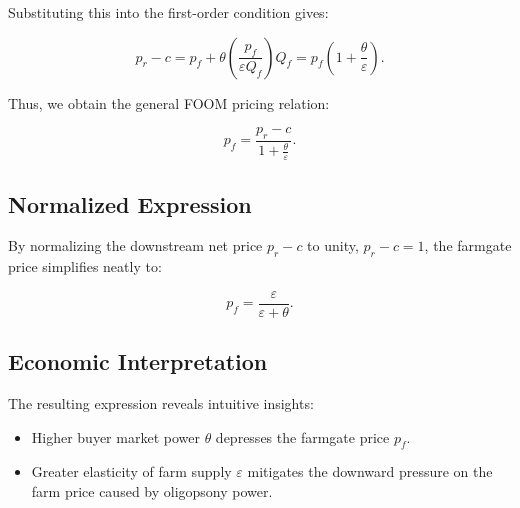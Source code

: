 Substituting this into the first-order condition gives:

\begin{equation}
p_r - c = p_f + \theta \left(\frac{p_f}{\varepsilon Q_f}\right)Q_f = p_f\left(1 + \frac{\theta}{\varepsilon}\right).
\end{equation}

Thus, we obtain the general FOOM pricing relation:

\begin{equation}
p_f = \frac{p_r - c}{1 + \frac{\theta}{\varepsilon}}.
\end{equation}

\subsection{Normalized Expression}

By normalizing the downstream net price \( p_r - c \) to unity, \( p_r - c = 1 \), the farmgate price simplifies neatly to:

\begin{equation}
p_f = \frac{\varepsilon}{\varepsilon + \theta}.
\end{equation}

\subsection{Economic Interpretation}

The resulting expression reveals intuitive insights:

\begin{itemize}
    \item Higher buyer market power \( \theta \) depresses the farmgate price \( p_f \).
    \item Greater elasticity of farm supply \( \varepsilon \) mitigates the downward pressure on the farm price caused by oligopsony power.
\end{itemize}
